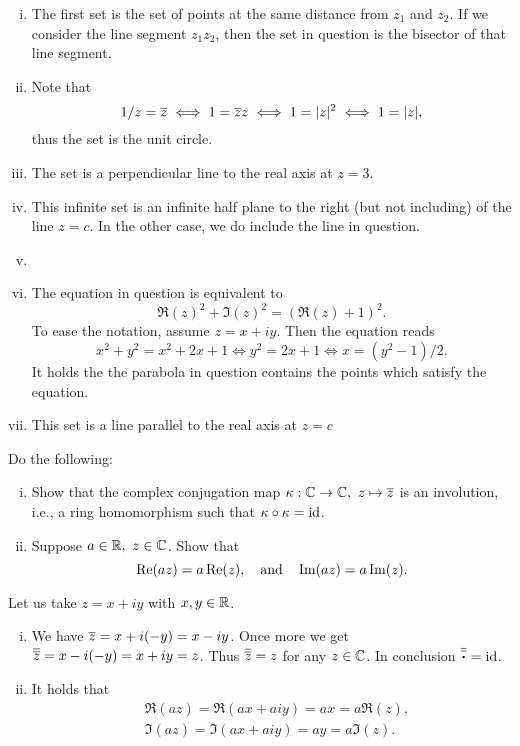 \documentclass[12pt]{memoir}
\begin{document}
\begin{ptcbr}
    \begin{enumerate}[i)]
        \itemsep=-0.4em
        \item The first set is the set of points at the same distance from $z_1$ and $z_2$. If we consider the line segment $z_1z_2$, then the set in question is the bisector of that line segment.
        \item Note that
        $$1/z=\overline z\iff 1=\overline zz\iff 1=|z|^2\iff 1=|z|,$$
        thus the set is the unit circle.
        \item The set is a perpendicular line to the real axis at $z=3$.
        \item This infinite set is an infinite half plane to the right (but not including) of the line $z=c$. In the other case, we do include the line in question.
        \item {}
        \item The equation in question is equivalent to 
        $$\Re(z)^2+\Im(z)^2=(\Re(z)+1)^2.$$
        To ease the notation, assume $z=x+iy$. Then the equation reads 
        $$x^2+y^2=x^2+2x+1\iff y^2=2x+1\iff x=(y^2-1)/2.$$
        It holds the the parabola in question contains the points which satisfy the equation.
        \item This set is a line parallel to the real axis at $z=c$
    \end{enumerate}
\end{ptcbr}

\begin{Ej}
    Do the following:
    \begin{enumerate}[i)]
        \itemsep=-0.4em
        \item Show that the complex conjugation map $\kappa:\mathbb{C}\to\mathbb{C},\ z\mapsto\overline z$ is an involution, i.e., a ring homomorphism such that $\kappa\circ\kappa=\operatorname{id}$.
        \item Suppose $a\in\mathbb{R},\ z\in\mathbb{C}$. Show that 
        $$\Re(az)=a\Re(z),\quad\text{and}\quad\Im(az)=a\Im(z).$$
    \end{enumerate}
\end{Ej}

\begin{ptcbr}
    Let us take $z=x+iy$ with $x,y\in\mathbb{R}$.
    \begin{enumerate}[i)]
        \itemsep=-0.4em
        \item We have $\overline z=x+i(-y)=x-iy$. Once more we get $\overline{\overline z}=x-i(-y)=x+iy=z$. Thus $\overline{\overline z}=z$ for any $z\in\mathbb{C}$. In conclusion $\ov{\ov \.}=\id$.
        \item It holds that 
        \begin{align*}
            &\Re(az)=\Re(ax+aiy)=ax=a\Re(z),\\
            &\Im(az)=\Im(ax+aiy)=ay=a\Im(z).
        \end{align*}
    \end{enumerate}
\end{ptcbr}
\end{document}
